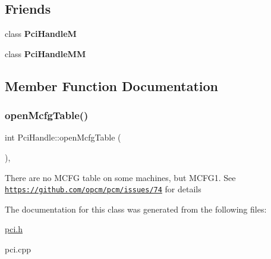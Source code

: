 \subsection*{Friends}
\begin{DoxyCompactItemize}
\item 
\mbox{\label{class_pci_handle_ab4094f771b56aa375bccb1397e1a18bc}} 
class {\bfseries Pci\+HandleM}
\item 
\mbox{\label{class_pci_handle_ad697cfb775e6784b97bf84b9f2a3938a}} 
class {\bfseries Pci\+Handle\+MM}
\end{DoxyCompactItemize}


\subsection{Member Function Documentation}
\mbox{\label{class_pci_handle_a9b5105f02947177df61ffe78ee81f022}} 
\subsubsection{\texorpdfstring{open\+Mcfg\+Table()}{openMcfgTable()}}
{\footnotesize\ttfamily int Pci\+Handle\+::open\+Mcfg\+Table (\begin{DoxyParamCaption}{ }\end{DoxyParamCaption})\hspace{0.3cm}{\ttfamily [static]}, {\ttfamily [protected]}}

There are no M\+C\+FG table on some machines, but M\+C\+F\+G1. See \href{https://github.com/opcm/pcm/issues/74}{\tt https\+://github.\+com/opcm/pcm/issues/74} for details

The documentation for this class was generated from the following files\+:\begin{DoxyCompactItemize}
\item 
\mbox{\hyperlink{pci_8h}{pci.\+h}}\item 
pci.\+cpp\end{DoxyCompactItemize}
